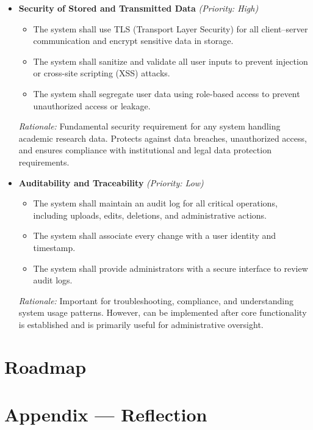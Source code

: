 \documentclass{article}
\begin{document}
\begin{itemize}
    \item \textbf{Security of Stored and Transmitted Data} \textit{(Priority: High)}
    \begin{itemize}
        \item The system shall use TLS (Transport Layer Security) for all client–server communication and encrypt sensitive data in storage.
        \item The system shall sanitize and validate all user inputs to prevent injection or cross-site scripting (XSS) attacks.
        \item The system shall segregate user data using role-based access to prevent unauthorized access or leakage.
    \end{itemize}
    \textit{Rationale:} Fundamental security requirement for any system handling academic research data. Protects against data breaches, unauthorized access, and ensures compliance with institutional and legal data protection requirements.

    \item \textbf{Auditability and Traceability} \textit{(Priority: Low)}
    \begin{itemize}
        \item The system shall maintain an audit log for all critical operations, including uploads, edits, deletions, and administrative actions.
        \item The system shall associate every change with a user identity and timestamp.
        \item The system shall provide administrators with a secure interface to review audit logs.
    \end{itemize}
    \textit{Rationale:} Important for troubleshooting, compliance, and understanding system usage patterns. However, can be implemented after core functionality is established and is primarily useful for administrative oversight.

\end{itemize}

\section{Roadmap}


\newpage{}

\section*{Appendix --- Reflection}
\end{document}
